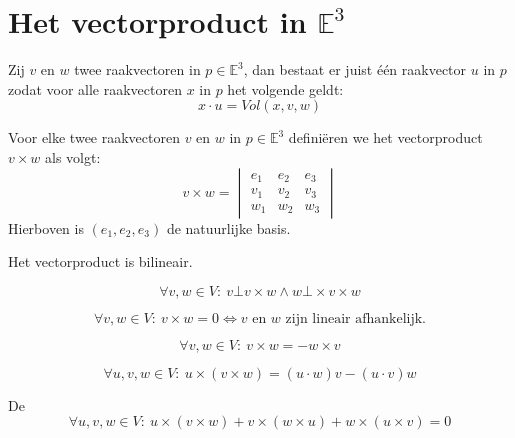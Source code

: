 \documentclass[main.tex]{subfiles}
\begin{document}
\chapter{Het vectorproduct in $\mathbb{E}^{3}$}
\label{cha:het-vect-mathbb}

\begin{lem}
  Zij $v$ en $w$ twee raakvectoren in $p\in \mathbb{E}^{3}$, dan bestaat er juist \'e\'en raakvector $u$ in $p$ zodat voor alle raakvectoren $x$ in $p$ het volgende geldt:
  \[ x \cdot u = Vol(x,v,w) \]
\end{lem}

\begin{de}
  Voor elke twee raakvectoren $v$ en $w$ in $p\in \mathbb{E}^{3}$ defini\"eren we het vectorproduct $v\times w$ als volgt:
  \[
  v \times w =
  \begin{vmatrix}
    e_{1} & e_{2} & e_{3}\\
    v_{1} & v_{2} & v_{3}\\
    w_{1} & w_{2} & w_{3}
  \end{vmatrix}
  \]
  Hierboven is $(e_{1},e_{2},e_{3})$ de natuurlijke basis.
\end{de}

\begin{st}
  Het vectorproduct is bilineair.
\end{st}

\begin{st}
  \[ \forall v,w \in V:\ v \bot v\times w \wedge w \bot \times v\times w \]
\end{st}

\begin{st}
  \[ \forall v,w \in V:\ v\times w = 0 \Leftrightarrow v \text{ en } w \text{ zijn lineair afhankelijk.} \]
\end{st}

\begin{st}
  \[ \forall v,w \in V:\ v\times w = - w\times v \]
\end{st}

\begin{st}
  \[ \forall u,v,w \in V:\ u \times (v \times w) = (u \cdot w)v - (u \cdot v)w \]
\end{st}

\begin{st}
  De \\
  \[ \forall u,v,w \in V:\ u \times (v \times w) + v \times (w \times u) + w \times (u \times v) = 0 \]
\end{st}
\end{document}
